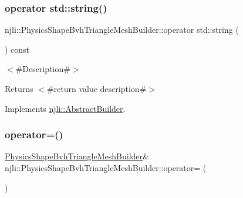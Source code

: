 \subsubsection{\texorpdfstring{operator std\+::string()}{operator std::string()}}
{\footnotesize\ttfamily njli\+::\+Physics\+Shape\+Bvh\+Triangle\+Mesh\+Builder\+::operator std\+::string (\begin{DoxyParamCaption}{ }\end{DoxyParamCaption}) const\hspace{0.3cm}{\ttfamily [virtual]}}

$<$\#\+Description\#$>$

\begin{DoxyReturn}{Returns}
$<$\#return value description\#$>$ 
\end{DoxyReturn}


Implements \mbox{\hyperlink{classnjli_1_1_abstract_builder_a3e6e553e06d1ca30517ad5fb0bd4d000}{njli\+::\+Abstract\+Builder}}.

\mbox{\label{classnjli_1_1_physics_shape_bvh_triangle_mesh_builder_a56d926d92fcf0c61be03b6ee09a0c079}} 
\subsubsection{\texorpdfstring{operator=()}{operator=()}}
{\footnotesize\ttfamily \mbox{\hyperlink{classnjli_1_1_physics_shape_bvh_triangle_mesh_builder}{Physics\+Shape\+Bvh\+Triangle\+Mesh\+Builder}}\& njli\+::\+Physics\+Shape\+Bvh\+Triangle\+Mesh\+Builder\+::operator= (\begin{DoxyParamCaption}\item[{const \mbox{\hyperlink{classnjli_1_1_physics_shape_bvh_triangle_mesh_builder}{Physics\+Shape\+Bvh\+Triangle\+Mesh\+Builder}} \&}]{ }\end{DoxyParamCaption})\hspace{0.3cm}{\ttfamily [protected]}}

\mbox{\label{classnjli_1_1_physics_shape_bvh_triangle_mesh_builder_a2ee0c6483dcec7a031bdee49488eba7b}} 
